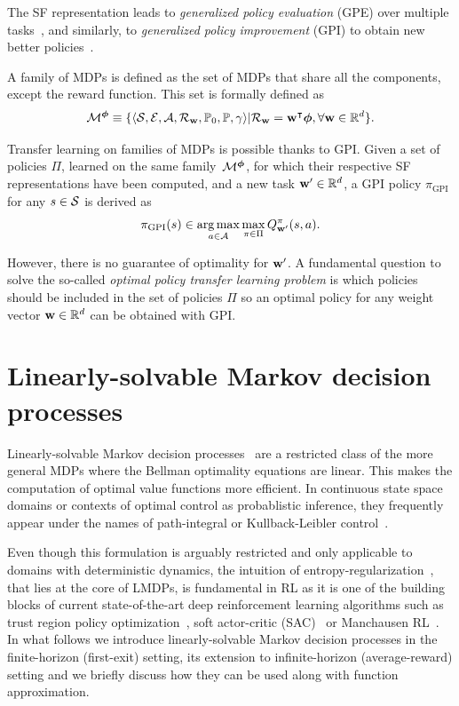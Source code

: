 {The SF representation leads to \textit{generalized policy evaluation} (GPE) over multiple tasks~\citep{Barreto2020a}, and similarly, to \textit{generalized policy improvement} (GPI) to obtain new better policies~\citep{Barreto2017}.

A family of MDPs is defined as the set of MDPs that share all the components, except the reward function. This set is formally defined as 
\begin{equation*}
    \mathcal{M}^{\boldsymbol{\phi}}\equiv\{\langle\mathcal{S},\mathcal{E},\mathcal{A},\mathcal{R}_{\mathbf{w}},\mathbb{P}_0, \mathbb{P},\gamma\rangle \lvert \mathcal{R}_{\mathbf{w}} = \mathbf{w}^\intercal \boldsymbol{\phi}, \forall\mathbf{w}\in\mathbb{R}^d\}.
\end{equation*}

Transfer learning on families of MDPs is possible thanks to GPI. Given a set of policies $\Pi$, learned on the same family~$\mathcal{M}^{\boldsymbol{\phi}}$, for which their respective SF representations have been computed, and a new task $\mathbf{w}'\in\mathbb{R}^d$, a GPI policy $\pi_{\text{GPI}}$ for any $s\in\mathcal{S}$ is derived as 
\begin{equation}
    \pi_{\text{GPI}}(s) \in \operatorname*{arg\,max}_{a\in\mathcal{A}} \max_{\pi\in\Pi} Q^\pi_{\mathbf{w}'}(s, a).
    \label{eq:gpi}
\end{equation}

However, there is no guarantee of optimality for $\mathbf{w}'$.
A fundamental question to solve the so-called \textit{optimal policy transfer learning problem} is which policies should be included in the set of policies $\Pi$ so an optimal policy for any weight vector $\mathbf{w}\in\mathbb{R}^d$ can be obtained with GPI. 
}

\section{Linearly-solvable Markov decision processes}

Linearly-solvable Markov decision processes~\citep{Todorov2006, Kappen2005} are a restricted class of the more general MDPs where the Bellman optimality equations are linear. This makes the computation of optimal value functions more efficient. In continuous state space domains or contexts of optimal control as probablistic inference, they frequently appear under the names of path-integral or Kullback-Leibler control~\citep{Kappen2012}. 

Even though this formulation is arguably restricted and only applicable to domains with deterministic dynamics, the intuition of entropy-regularization~\citep{Neu2017}, that lies at the core of LMDPs, is fundamental in RL as it is one of the building blocks of current state-of-the-art deep reinforcement learning algorithms such as trust region policy optimization~\citep{Schulman2015}, soft actor-critic (SAC)~\citep{Haarnoja2018} or Manchausen RL~\citep{Vieillard2020}. In what follows we introduce linearly-solvable Markov decision processes in the finite-horizon (first-exit) setting, its extension to infinite-horizon (average-reward) setting and we briefly discuss how they can be used along with function approximation.

